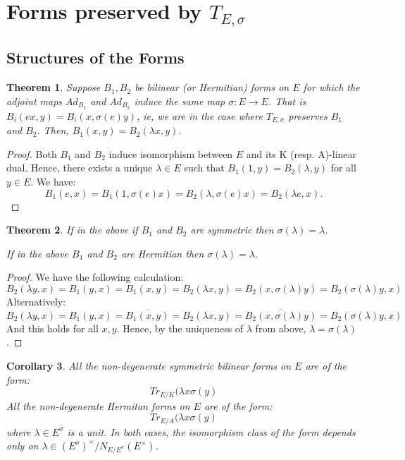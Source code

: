 \documentclass{article}
\theoremstyle{plain}
\newtheorem{theorem}{Theorem}[section]
\newtheorem{corollary}[theorem]{Corollary}
\theoremstyle{definition}
\begin{document}
\section{Forms preserved by $T_{E,\sigma}$}

\subsection{Structures of the Forms}

\begin{theorem}
Suppose $B_1,B_2$ be bilinear (or Hermitian) forms on $E$ for which the adjoint maps $Ad_{B_1}$ and $Ad_{B_2}$ induce the same map $\sigma:E\rightarrow E$.
That is $B_i(ex,y) = B_i(x,\sigma(e)y)$, ie, we are in the case where $T_{E,\sigma}$ preserves $B_1$ and $B_2$.
Then, $B_1(x,y) = B_2(\lambda x,y)$.
\end{theorem}
\begin{proof}
Both $B_1$ and $B_2$ induce isomorphism between $E$ and its K (resp. A)-linear dual.
Hence, there exists a unique $\lambda\in E$ such that $B_1(1,y) = B_2(\lambda,y)$ for all $y\in E$.
We have:
\[ B_1(e,x) = B_1(1,\sigma(e)x) = B_2(\lambda,\sigma(e)x) = B_2(\lambda e,x). \]
\end{proof}
\begin{theorem}
If in the above if $B_1$ and $B_2$ are symmetric then $\sigma(\lambda)=\lambda$.

If in the above $B_1$ and $B_2$ are Hermitian then $\sigma(\lambda)=\lambda$.
\end{theorem}
\begin{proof}
We have the following calculation:
\[ B_2(\lambda y,x) = B_1(y,x) = B_1(x,y) = B_2(\lambda x,y) = B_2(x,\sigma(\lambda) y) = B_2(\sigma(\lambda)y,x) \]
Alternatively:
\[ B_2(\lambda y,x) = B_1(y,x) = \overline{B_1(x,y)} = B_2(\lambda x,y) = \overline{B_2(x,\sigma(\lambda) y)} = B_2(\sigma(\lambda)y,x) \]
And this holds for all $x,y$.
Hence, by the uniqueness of $\lambda$ from above, $\lambda=\sigma(\lambda)$.
\end{proof}
\begin{corollary}
All the non-degenerate symmetric bilinear forms on $E$ are of the form:
\[ Tr_{E/K}(\lambda x\sigma(y) \]
All the non-degenerate Hermitan forms on $E$ are of the form:
\[ Tr_{E/A}(\lambda x\sigma(y) \]
where $\lambda \in E^\sigma$ is a unit.
In both cases, the isomorphism class of the form depends only on $\lambda \in (E^\sigma)^\times/N_{E/E^\sigma}(E^\times)$.
\end{corollary}
\end{document}
